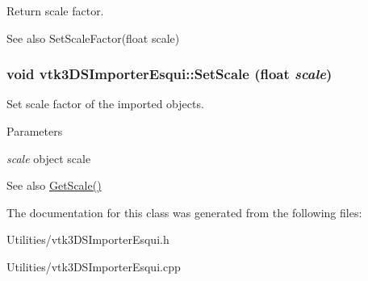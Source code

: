 Return scale factor. \begin{DoxySeeAlso}{See also}
SetScaleFactor(float scale) 
\end{DoxySeeAlso}
\hypertarget{classvtk3DSImporterEsqui_a79eed232c14247f4a9916c98ac5f5acc}{
\subsubsection[{SetScale}]{\setlength{\rightskip}{0pt plus 5cm}void vtk3DSImporterEsqui::SetScale (float {\em scale})}}
\label{classvtk3DSImporterEsqui_a79eed232c14247f4a9916c98ac5f5acc}


Set scale factor of the imported objects. 
\begin{DoxyParams}{Parameters}
\item[{\em scale}]object scale \end{DoxyParams}
\begin{DoxySeeAlso}{See also}
\hyperlink{classvtk3DSImporterEsqui_a3951ad4b8163e28825f7f9afdfcfa46c}{GetScale()} 
\end{DoxySeeAlso}


The documentation for this class was generated from the following files:\begin{DoxyCompactItemize}
\item 
Utilities/vtk3DSImporterEsqui.h\item 
Utilities/vtk3DSImporterEsqui.cpp\end{DoxyCompactItemize}
